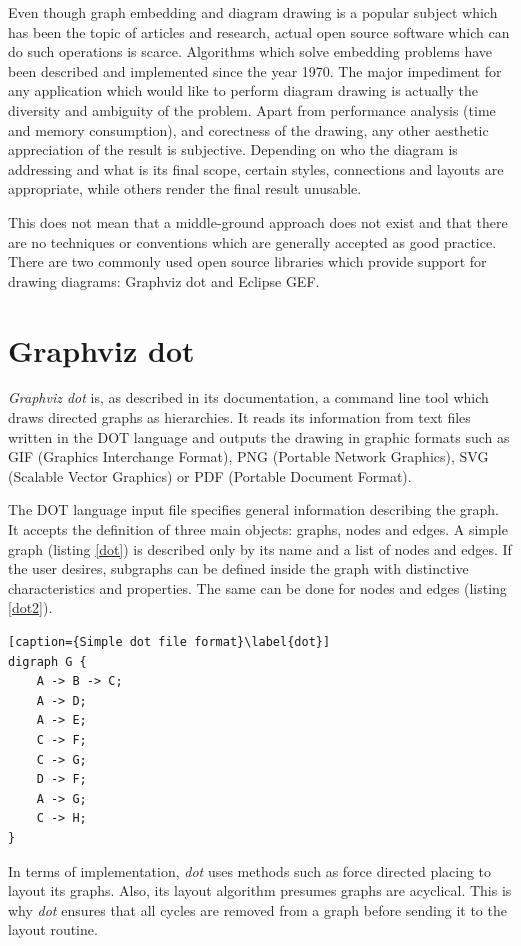 Even though graph embedding and diagram drawing is a popular subject which has been the topic of articles and research, 
actual open source software which can do such operations is scarce. Algorithms which solve embedding problems have been 
described and implemented since the year 1970. The major impediment for any application which would like to perform 
diagram drawing is actually the diversity and ambiguity of the problem. Apart from performance analysis (time and 
memory consumption), and corectness of the drawing, any other aesthetic appreciation of the result is subjective.
Depending on who the diagram is addressing and what is its final scope, certain styles, connections and layouts are 
appropriate, while others render the final result unusable.

This does not mean that a middle-ground approach does not exist and that there are no techniques or conventions which are 
generally accepted as good practice. There are two commonly used open source libraries which provide support for 
drawing diagrams: Graphviz dot\cite{graphvizrelwork} and Eclipse GEF\cite{eclipsegefrelwork}.

\section{Graphviz dot}

\emph{Graphviz dot} is, as described in its documentation, a command line tool which draws directed graphs as 
hierarchies. It reads its information from text files written in the DOT language and outputs the drawing in 
graphic formats such as GIF (Graphics Interchange Format), PNG (Portable Network Graphics), SVG (Scalable Vector 
Graphics) or PDF (Portable Document Format).

The DOT language input file specifies general information describing the graph. It accepts the definition of three 
main objects: graphs, nodes and edges. A simple graph (listing \ref{dot}) is described only by its name and a list of nodes and edges.
If the user desires, subgraphs can be defined inside the graph with distinctive characteristics and properties. 
The same can be done for nodes and edges (listing \ref{dot2}).

\begin{lstlisting}[caption={Simple dot file format}\label{dot}]
digraph G {
	A -> B -> C;
	A -> D;
	A -> E;
	C -> F;
	C -> G;
	D -> F;
	A -> G;
	C -> H;
}
\end{lstlisting}

In terms of implementation, \emph{dot} uses methods such as force directed placing to layout its graphs. Also, its 
layout algorithm presumes graphs are acyclical. This is why \emph{dot} ensures that all cycles are removed from a graph 
before sending it to the layout routine. 

